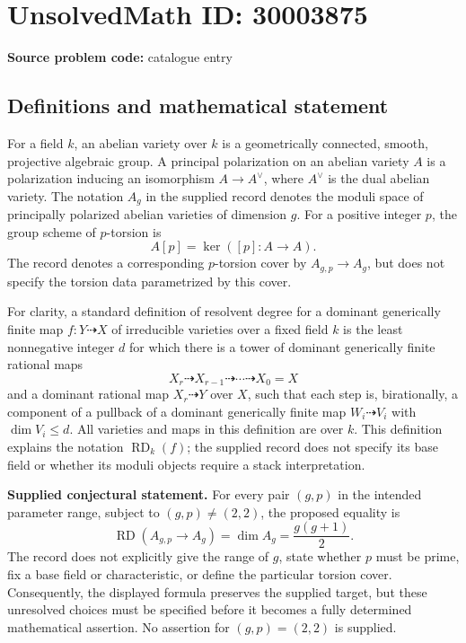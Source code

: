 \documentclass[11pt]{article}
\begin{document}
\section*{UnsolvedMath ID: 30003875}
\textbf{Source problem code:} catalogue entry
\subsection{Definitions and mathematical statement}
For a field \(k\), an abelian variety over \(k\) is a geometrically connected, smooth, projective algebraic group. A principal polarization on an abelian variety \(A\) is a polarization inducing an isomorphism \(A\to A^\vee\), where \(A^\vee\) is the dual abelian variety. The notation \(A_g\) in the supplied record denotes the moduli space of principally polarized abelian varieties of dimension \(g\). For a positive integer \(p\), the group scheme of \(p\)-torsion is
\[
A[p]=\ker([p]\colon A\longrightarrow A).
\]
The record denotes a corresponding \(p\)-torsion cover by \(A_{g,p}\to A_g\), but does not specify the torsion data parametrized by this cover.

For clarity, a standard definition of resolvent degree for a dominant generically finite map \(f\colon Y\dashrightarrow X\) of irreducible varieties over a fixed field \(k\) is the least nonnegative integer \(d\) for which there is a tower of dominant generically finite rational maps
\[
X_r\dashrightarrow X_{r-1}\dashrightarrow\cdots\dashrightarrow X_0=X
\]
and a dominant rational map \(X_r\dashrightarrow Y\) over \(X\), such that each step is, birationally, a component of a pullback of a dominant generically finite map \(W_i\dashrightarrow V_i\) with \(\dim V_i\leq d\). All varieties and maps in this definition are over \(k\). This definition explains the notation \(\operatorname{RD}_k(f)\); the supplied record does not specify its base field or whether its moduli objects require a stack interpretation.

\textbf{Supplied conjectural statement.} For every pair \((g,p)\) in the intended parameter range, subject to \((g,p)\neq(2,2)\), the proposed equality is
\[
\operatorname{RD}(A_{g,p}\longrightarrow A_g)
=\dim A_g
=\frac{g(g+1)}{2}.
\]
The record does not explicitly give the range of \(g\), state whether \(p\) must be prime, fix a base field or characteristic, or define the particular torsion cover. Consequently, the displayed formula preserves the supplied target, but these unresolved choices must be specified before it becomes a fully determined mathematical assertion. No assertion for \((g,p)=(2,2)\) is supplied.
\end{document}
